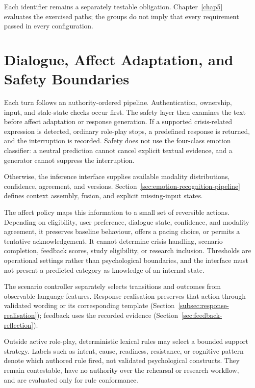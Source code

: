 Each identifier remains a separately testable obligation. Chapter~\ref{chap5} evaluates the exercised paths; the groups do not imply that every requirement passed in every configuration.

\section{Dialogue, Affect Adaptation, and Safety Boundaries}
\label{sec:dialogue-affect-safety-boundaries}

Each turn follows an authority-ordered pipeline. Authentication, ownership, input, and stale-state checks occur first. The safety layer then examines the text before affect adaptation or response generation. If a supported crisis-related expression is detected, ordinary role-play stops, a predefined response is returned, and the interruption is recorded. Safety does not use the four-class emotion classifier: a neutral prediction cannot cancel explicit textual evidence, and a generator cannot suppress the interruption.

Otherwise, the inference interface supplies available modality distributions, confidence, agreement, and versions. Section~\ref{sec:emotion-recognition-pipeline} defines context assembly, fusion, and explicit missing-input states.

The affect policy maps this information to a small set of reversible actions. Depending on eligibility, user preference, dialogue state, confidence, and modality agreement, it preserves baseline behaviour, offers a pacing choice, or permits a tentative acknowledgement. It cannot determine crisis handling, scenario completion, feedback scores, study eligibility, or research inclusion. Thresholds are operational settings rather than psychological boundaries, and the interface must not present a predicted category as knowledge of an internal state.

The scenario controller separately selects transitions and outcomes from observable language features. Response realisation preserves that action through validated wording or its corresponding template (Section~\ref{subsec:response-realisation}); feedback uses the recorded evidence (Section~\ref{sec:feedback-reflection}).

Outside active role-play, deterministic lexical rules may select a bounded support strategy. Labels such as intent, cause, readiness, resistance, or cognitive pattern denote which authored rule fired, not validated psychological constructs. They remain contestable, have no authority over the rehearsal or research workflow, and are evaluated only for rule conformance.

